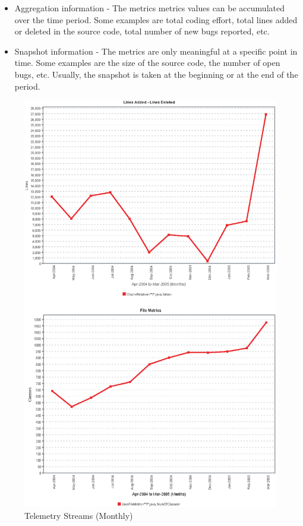\begin{itemize}
	\item Aggregation information - The metrics metrics values can be accumulated over the time period. Some examples are total coding effort, total lines added or deleted in the source code, total number of new bugs reported, etc.
	
	\item Snapshot information - The metrics are only meaningful at a specific point in time. Some examples are the size of the source code, the number of open bugs, etc. Usually, the snapshot is taken at the beginning or at the end of the period.
\end{itemize}



\begin{figure}[p]
  \centering
  \includegraphics[height=0.90\textheight]{figures/TelemetryStreamIntro-Monthly}
  \caption{Telemetry Streams (Monthly)} 
  \label{fig:TelemetryStreamIntroMonthly}
\end{figure}


